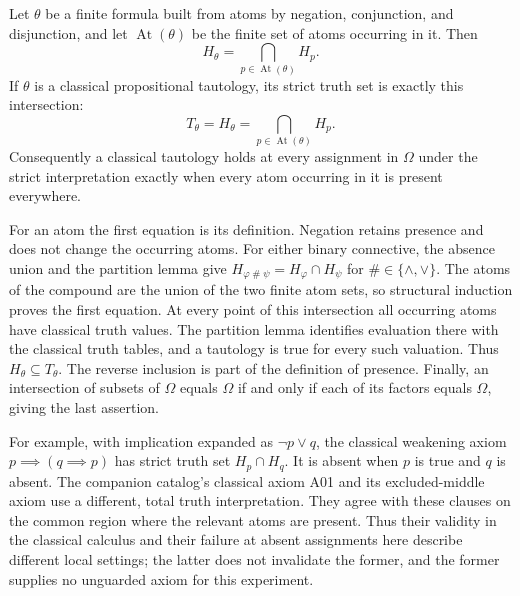 \begin{proposition}
\label{prop:strict_tautology_presence}
Let $\theta$ be a finite formula built from atoms by negation,
conjunction, and disjunction, and let $\operatorname{At}(\theta)$ be
the finite set of atoms occurring in it. Then
\[
H_\theta=\bigcap_{p\in\operatorname{At}(\theta)}H_p.
\]
If $\theta$ is a classical propositional tautology, its strict truth
set is exactly this intersection:
\[
T_\theta=H_\theta
 =\bigcap_{p\in\operatorname{At}(\theta)}H_p.
\]
Consequently a classical tautology holds at every assignment in
$\Omega$ under the strict interpretation exactly when every atom
occurring in it is present everywhere.
\end{proposition}
\Proof
For an atom the first equation is its definition. Negation retains
presence and does not change the occurring atoms. For either binary
connective, the absence union and the partition lemma give
$H_{\varphi\mathbin{\#}\psi}=H_\varphi\cap H_\psi$ for
$\#\in\{\land,\lor\}$. The atoms of the compound are the union
of the two finite atom sets, so structural induction proves the first
equation. At every point of this intersection all occurring atoms have
classical truth values. The partition lemma identifies evaluation there
with the classical truth tables, and a tautology is true for every such
valuation. Thus $H_\theta\subseteq T_\theta$. The reverse inclusion
is part of the definition of presence. Finally, an intersection of
subsets of $\Omega$ equals $\Omega$ if and only if each of its factors
equals $\Omega$, giving the last assertion.
\Done

For example, with implication expanded as $\neg p\lor q$, the
classical weakening axiom $p\implies(q\implies p)$ has strict truth
set $H_p\cap H_q$. It is absent when $p$ is true and $q$ is absent.
The companion catalog's classical axiom A01 and its excluded-middle
axiom use a different, total truth interpretation. They agree with
these clauses on the common region where the relevant atoms are
present. Thus their validity in the classical calculus and their
failure at absent assignments here describe different local settings;
the latter does not invalidate the former, and the former supplies
no unguarded axiom for this experiment.

